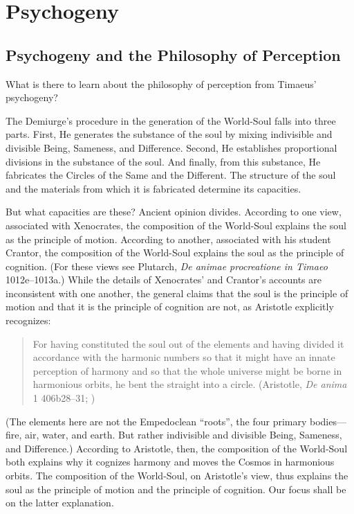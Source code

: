 
\chapter{Psychogeny} %
\label{cha:psychogeny}

\section{Psychogeny and the Philosophy of Perception} %
\label{sec:psychogeny_and_the_philosophy_of_perception}

What is there to learn about the philosophy of perception from Timaeus' psychogeny? 

The Demiurge's procedure in the generation of the World-Soul falls into three parts. First, He generates the substance of the soul by mixing indivisible and divisible Being, Sameness, and Difference. Second, He establishes proportional divisions in the substance of the soul. And finally, from this substance, He fabricates the Circles of the Same and the Different. The structure of the soul and the materials from which it is fabricated determine its capacities. 

But what capacities are these? Ancient opinion divides. According to one view, associated with Xenocrates, the composition of the World-Soul explains the soul as the principle of motion. According to another, associated with his student Crantor, the composition of the World-Soul explains the soul as the principle of cognition. (For these views see Plutarch, \emph{De animae procreatione in Timaeo} 1012e--1013a.) While the details of Xenocrates' and Crantor's accounts are inconsistent with one another, the general claims that the soul is the principle of motion and that it is the principle of cognition are not, as Aristotle explicitly recognizes:
\begin{quote}
	For having constituted the soul out of the elements and having divided it accordance with the harmonic numbers so that it might have an innate perception of harmony and so that the whole universe might be borne in harmonious orbits, he bent the straight into a circle. (Aristotle, \emph{De anima} 1 406b28--31; \citealt[10]{Shields:2016ix})
\end{quote}
(The elements here are not the Empedoclean ``roots'', the four primary bodies---fire, air, water, and earth. But rather indivisible and divisible Being, Sameness, and Difference.) According to Aristotle, then, the composition of the World-Soul both explains why it cognizes harmony and moves the Cosmos in harmonious orbits. The composition of the World-Soul, on Aristotle's view, thus explains the soul as the principle of motion and the principle of cognition. Our focus shall be on the latter explanation.

